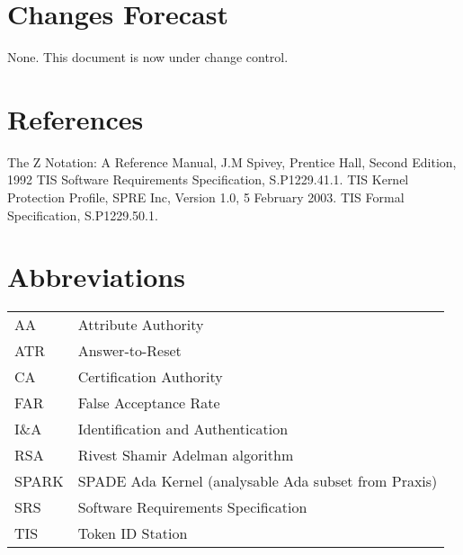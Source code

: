 \documentclass{pxcsdoc}
\begin{document}
\section*{Changes Forecast}

None. This document is now under change control.

\section*{References}
\begin{thebibliography}{99}
The Z Notation: A Reference Manual, J.M Spivey, Prentice Hall, Second Edition,
1992
TIS Software Requirements Specification, S.P1229.41.1.
TIS Kernel Protection Profile, SPRE Inc, Version 1.0, 5 February 2003.
TIS Formal Specification, S.P1229.50.1.
\end{thebibliography}

\section*{Abbreviations}
{\footnotesize\begin{tabular}{ll}
AA           & Attribute Authority \\
ATR          & Answer-to-Reset \\
CA           & Certification Authority \\
FAR          & False Acceptance Rate \\
I\&A         & Identification and Authentication \\
RSA          & Rivest Shamir Adelman algorithm \\   
SPARK        & SPADE Ada Kernel (analysable Ada subset from Praxis) \\
SRS          & Software Requirements Specification \\
TIS          & Token ID Station \\
\end{tabular}}



\tableofcontents











\end{document}
